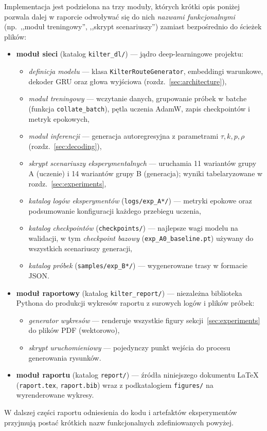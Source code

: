 \documentclass[12pt,a4paper]{article}
\begin{document}
Implementacja jest podzielona na trzy moduły, których krótki opis poniżej pozwala dalej w raporcie odwoływać się do nich \emph{nazwami funkcjonalnymi} (np.\ ,,moduł treningowy'', ,,skrypt scenariuszy'') zamiast bezpośrednio do ścieżek plików:
\begin{itemize}[leftmargin=1.5em]
    \item \textbf{moduł sieci} (katalog \texttt{kilter\_dl/}) --- jądro deep-learningowe projektu:
    \begin{itemize}[leftmargin=1.5em]
        \item \emph{definicja modelu} --- klasa \texttt{KilterRouteGenerator}, embeddingi warunkowe, dekoder GRU oraz głowa wyjściowa (rozdz.~\ref{sec:architecture}),
        \item \emph{moduł treningowy} --- wczytanie danych, grupowanie próbek w batche (funkcja \texttt{collate\_batch}), pętla uczenia AdamW, zapis checkpointów i metryk epokowych,
        \item \emph{moduł inferencji} --- generacja autoregresyjna z parametrami $\tau, k, p, \rho$ (rozdz.~\ref{sec:decoding}),
        \item \emph{skrypt scenariuszy eksperymentalnych} --- uruchamia 11 wariantów grupy A (uczenie) i 14 wariantów grupy B (generacja); wyniki tabelaryzowane w rozdz.~\ref{sec:experiments},
        \item \emph{katalog logów eksperymentów} (\texttt{logs/exp\_A*/}) --- metryki epokowe oraz podsumowanie konfiguracji każdego przebiegu uczenia,
        \item \emph{katalog checkpointów} (\texttt{checkpoints/}) --- najlepsze wagi modelu na walidacji, w tym \emph{checkpoint bazowy} (\texttt{exp\_A0\_baseline.pt}) używany do wszystkich scenariuszy generacji,
        \item \emph{katalog próbek} (\texttt{samples/exp\_B*/}) --- wygenerowane trasy w formacie JSON.
    \end{itemize}
    \item \textbf{moduł raportowy} (katalog \texttt{kilter\_report/}) --- niezależna biblioteka Pythona do produkcji wykresów raportu z surowych logów i plików próbek:
    \begin{itemize}[leftmargin=1.5em]
        \item \emph{generator wykresów} --- renderuje wszystkie figury sekcji~\ref{sec:experiments} do plików PDF (wektorowo),
        \item \emph{skrypt uruchomieniowy} --- pojedynczy punkt wejścia do procesu generowania rysunków.
    \end{itemize}
    \item \textbf{moduł raportu} (katalog \texttt{report/}) --- źródła niniejszego dokumentu LaTeX (\texttt{raport.tex}, \texttt{raport.bib}) wraz z podkatalogiem \texttt{figures/} na wyrenderowane wykresy.
\end{itemize}
W dalszej części raportu odniesienia do kodu i artefaktów eksperymentów przyjmują postać krótkich nazw funkcjonalnych zdefiniowanych powyżej.
\end{document}
